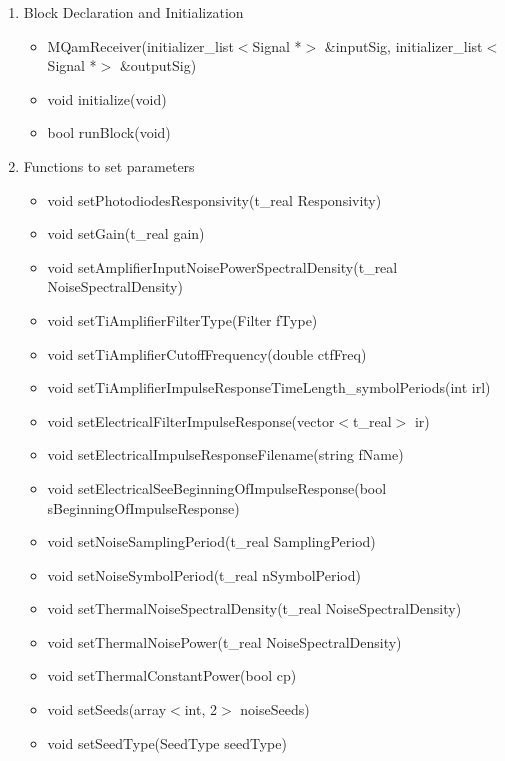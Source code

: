 \begin{enumerate}
         \item Block Declaration and Initialization
             \begin{itemize}
                 \item MQamReceiver(initializer\_list$<$Signal *$>$ \&inputSig, initializer\_list$<$Signal *$>$ \&outputSig)
                 \item void initialize(void)
	             \item bool runBlock(void)
             \end{itemize}
         \item Functions to set parameters
             \begin{itemize}
                \item void setPhotodiodesResponsivity(t\_real Responsivity)
                \item void setGain(t\_real gain)
                \item void setAmplifierInputNoisePowerSpectralDensity(t\_real NoiseSpectralDensity)
                \item void setTiAmplifierFilterType(Filter fType)
                \item void setTiAmplifierCutoffFrequency(double ctfFreq)
                \item void setTiAmplifierImpulseResponseTimeLength\_symbolPeriods(int irl)
                \item void setElectricalFilterImpulseResponse(vector$<$t\_real$>$ ir)
                \item void setElectricalImpulseResponseFilename(string fName)
                \item void setElectricalSeeBeginningOfImpulseResponse\newline(bool sBeginningOfImpulseResponse)
                \item void setNoiseSamplingPeriod(t\_real SamplingPeriod)
                \item void setNoiseSymbolPeriod(t\_real nSymbolPeriod)
                \item void setThermalNoiseSpectralDensity(t\_real NoiseSpectralDensity)
                \item void setThermalNoisePower(t\_real NoiseSpectralDensity)
                \item void setThermalConstantPower(bool cp)
                \item void setSeeds(array$<$int, 2$>$ noiseSeeds)
                \item void setSeedType(SeedType seedType)

\end{itemize}
\end{enumerate}
